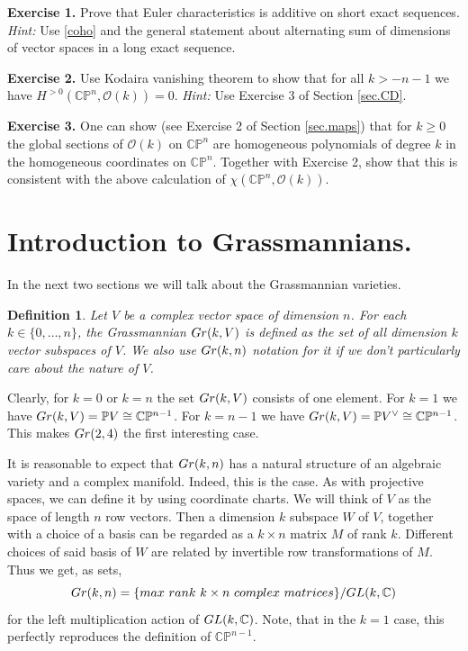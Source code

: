\documentclass[11pt]{article}
\numberwithin{equation}{section}
\numberwithin{footnote}{section}
\newtheorem{defn}[thm]{Definition}
\newcommand{\blue}{\color{blue}}
\newcommand{\Gr}{{\rm Gr}}
\renewcommand{\P}{{\mathbb P}}
\newcommand{\C}{{\mathbb C}}
\begin{document}
\smallskip


{\bf Exercise 1.} Prove that Euler characteristics is additive on short exact sequences. \emph{Hint:} Use \eqref{coho} and the general statement about alternating sum of dimensions of vector spaces in a long exact sequence.

{\bf Exercise 2.} Use Kodaira vanishing theorem to show that  for all $k>-n-1$ we have $H^{>0}(\C\P^n,\mathcal O(k))=0$. \emph{Hint:} Use
Exercise 3 of Section \ref{sec.CD}.

{\bf Exercise 3.} One can show (see Exercise 2 of Section \ref{sec.maps}) that for $k\geq 0$ the global sections of $\mathcal O(k)$ on $\C\P^n$ are homogeneous polynomials of degree $k$ in the homogeneous coordinates on $\C\P^n$. Together with Exercise 2, show that this is consistent with the above calculation of $\chi(\C\P^n, \mathcal O(k))$.


\section{Introduction to Grassmannians.}
In the next two sections we will talk about the {\blue Grassmannian} varieties. 

\smallskip
\begin{defn}
Let $V$ be a complex vector space of dimension $n$. For each $k\in \{0,\ldots,n\}$,
the Grassmannian $\Gr(k,V)$ is defined as the set of all dimension $k$ vector subspaces of $V$.
We also use $\Gr(k,n)$ notation for it if we don't particularly care about the nature of $V$.
\end{defn}

Clearly, for $k=0$ or $k=n$ the set $\Gr(k,V)$ consists of one element.
For $k=1$ we have $\Gr(k,V) = \P V\cong \C\P^{n-1}$.
For $k=n-1$ we have $\Gr(k,V) = \P V^\vee\cong \C\P^{n-1}$. This makes $\Gr(2,4)$ the first interesting case.

\smallskip
It is reasonable to expect that $\Gr(k,n)$ has a natural structure of an algebraic variety and a complex manifold. Indeed, this is the case. As with projective spaces, we can define it by using coordinate charts.
We will think of $V$ as the space of length $n$ {\blue row} vectors. Then a dimension $k$ subspace $W$ of $V$, {\blue together with a choice of a basis} can be regarded as a $k\times n$ matrix $M$ of rank $k$. Different choices of said basis of $W$ are related by invertible row transformations of $M$.
Thus we get, as sets,
$$
\Gr(k,n) = \{{\rm max~rank~} k\times n {\rm~complex~matrices}\}/{\rm GL}(k,\C)
$$
for the left multiplication action of ${\rm GL}(k,\C)$. Note, that in the $k=1$ case, this perfectly reproduces the definition of $\C\P^{n-1}$. 
\end{document}
